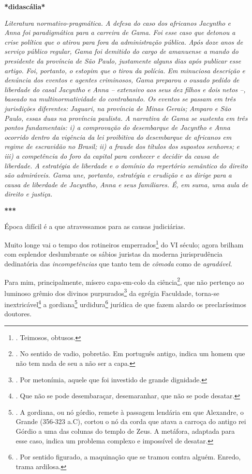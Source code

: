 \textbf{*didascália*}

\emph{Literatura normativo-pragmática. A defesa do caso dos africanos
Jacyntho e Anna foi paradigmática para a carreira de Gama. Foi esse caso
que detonou a crise política que o atirou para fora da administração
pública. Após doze anos de serviço público regular, Gama foi demitido do
cargo de amanuense a mando do presidente da província de São Paulo,
justamente alguns dias após publicar esse artigo. Foi, portanto, o
estopim que o tirou da polícia. Em minuciosa descrição e denúncia dos
eventos e agentes criminosos, Gama preparou o ousado pedido de liberdade
do casal Jacyntho e Anna -- extensivo aos seus dez filhos e dois netos
--, baseado na multinormatividade do contrabando. Os eventos se passam
em três jurisdições diferentes: Jaguari, na província de Minas Gerais;
Amparo e São Paulo, essas duas na província paulista. A narrativa de
Gama se sustenta em três pontos fundamentais: i) a comprovação do
desembarque de Jacyntho e Anna ocorrido dentro da vigência da lei
proibitiva do desembarque de africanos em regime de escravidão no
Brasil; ii) a fraude dos títulos dos supostos senhores; e iii) a
competência do foro da capital para conhecer e decidir da causa de
liberdade. A estratégia de liberdade e o domínio do repertório semântico
do direito são admiráveis. Gama une, portanto, estratégia e erudição e
as dirige para a causa de liberdade de Jacyntho, Anna e seus familiares.
É, em suma, uma aula de direito e justiça.}

\textbf{***}

Época difícil é a que atravessamos para as causas judiciárias.

Muito longe vai o tempo dos rotineiros emperrados\footnote{. Teimosos,
  obtusos.} do VI século; agora brilham com esplendor deslumbrante os
sábios juristas da moderna jurisprudência dedinatória das
\emph{incompetências} que tanto tem de \emph{cômoda} como de
\emph{agradável}.

Para mim, principalmente, mísero capa-em-colo da ciência\footnote{. No
  sentido de vadio, pobretão. Em português antigo, indica um homem que
  não tem nada de seu a não ser a capa.}, que não pertenço ao luminoso
grêmio dos divinos purpurados\footnote{. Por metonímia, aquele que foi
  investido de grande dignidade.} da egrégia Faculdade, torna-se
inextricável\footnote{. Que não se pode desembaraçar, desemaranhar, que
  não se pode desatar.} a gordiana\footnote{. A gordiana, ou nó górdio,
  remete à passagem lendária em que Alexandre, o Grande (356-323 a.C),
  cortou o nó da corda que atava a carroça do antigo rei Górdio a uma
  das colunas do templo de Zeus. A metáfora, adaptada para esse caso,
  indica um problema complexo e impossível de desatar.}
urdidura\footnote{. Por sentido figurado, a maquinação que se tramou
  contra alguém. Enredo, trama ardilosa.} jurídica de que fazem alardo
os preclaríssimos doutores.

